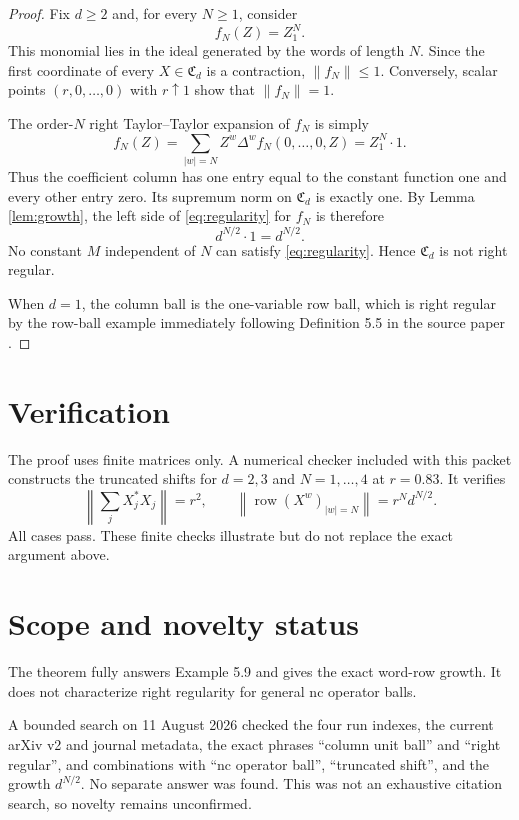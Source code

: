\documentclass[10pt]{article}
\newcommand{\Cball}{\mathfrak C}
\begin{document}
\begin{proof}
Fix $d\ge2$ and, for every $N\ge1$, consider
\[
 f_N(Z)=Z_1^N.
\]
This monomial lies in the ideal generated by the words of length $N$.  Since
the first coordinate of every $X\in\Cball_d$ is a contraction,
$\|f_N\|\le1$.  Conversely, scalar points $(r,0,\ldots,0)$ with $r\uparrow1$
show that $\|f_N\|=1$.

The order-$N$ right Taylor--Taylor expansion of $f_N$ is simply
\[
 f_N(Z)=\sum_{|w|=N}Z^w\Delta^wf_N(0,\ldots,0,Z)=Z_1^N\cdot1.
\]
Thus the coefficient column has one entry equal to the constant function one
and every other entry zero.  Its supremum norm on $\Cball_d$ is exactly one.
By Lemma \ref{lem:growth}, the left side of \eqref{eq:regularity} for $f_N$
is therefore
\[
 d^{N/2}\cdot1=d^{N/2}.
\]
No constant $M$ independent of $N$ can satisfy \eqref{eq:regularity}.  Hence
$\Cball_d$ is not right regular.

When $d=1$, the column ball is the one-variable row ball, which is right
regular by the row-ball example immediately following Definition 5.5 in the
source paper \cite{SampatShalit2025}.
\end{proof}

\section{Verification}

The proof uses finite matrices only.  A numerical checker included with this
packet constructs the truncated shifts for $d=2,3$ and $N=1,\ldots,4$ at
$r=0.83$.  It verifies
\[
 \left\|\sum_jX_j^*X_j\right\|=r^2,
 \qquad
 \left\|\operatorname{row}(X^w)_{|w|=N}\right\|=r^Nd^{N/2}.
\]
All cases pass.  These finite checks illustrate but do not replace the exact
argument above.

\section{Scope and novelty status}

The theorem fully answers Example 5.9 and gives the exact word-row growth.
It does not characterize right regularity for general nc operator balls.

A bounded search on 11 August 2026 checked the four run indexes, the current
arXiv v2 and journal metadata, the exact phrases ``column unit ball'' and
``right regular'', and combinations with ``nc operator ball'', ``truncated
shift'', and the growth $d^{N/2}$.  No separate answer was found.  This was
not an exhaustive citation search, so novelty remains unconfirmed.
\end{document}
